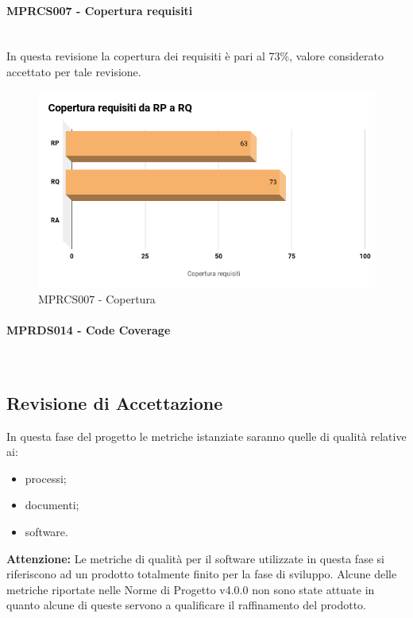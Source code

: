 \paragraph{MPRCS007 - Copertura requisiti}\mbox{}\\[0.4cm]
In questa revisione la copertura dei requisiti è pari al 73\%, valore considerato accettato per tale revisione.
\begin{figure}[H]
	\centering
	\includegraphics[width=13cm,keepaspectratio]{../includes/pics/CoperturaRP_RQ.png}
	\caption{\label{fig:mission}MPRCS007 - Copertura}
\end{figure}
\paragraph{MPRDS014 - Code Coverage}\mbox{}\\[0.4cm]
\label{sec:CCRQ}

\clearpage
\subsection{Revisione di Accettazione}
\label{sec:revisione_accettazione}
In questa fase del progetto le metriche istanziate saranno quelle di qualità relative ai:
\begin{itemize}
	\item processi;
	\item documenti;
	\item software.
\end{itemize}
\textbf{Attenzione:} Le metriche di qualità per il software utilizzate in questa fase si riferiscono ad un prodotto totalmente finito per la fase di sviluppo. Alcune delle metriche riportate nelle Norme di Progetto v4.0.0 non sono state attuate in quanto alcune di queste servono a qualificare il raffinamento del prodotto.
